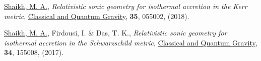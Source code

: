\begin{etaremune}
\item \underline{Shaikh, M. A.}, {\itshape Relativistic sonic geometry for isothermal accretion in the Kerr metric}, \href{https://doi.org/10.1088%2F1361-6382%2Faaa5cd}{{Classical and Quantum Gravity}}, {\bfseries 35}, 055002, (2018).
\item \underline{Shaikh, M. A.}, Firdousi, I. \& Das, T. K., {\itshape Relativistic sonic geometry for isothermal accretion in the Schwarzschild metric}, \href{https://doi.org/10.1088%2F1361-6382%2Faa7b19}{{Classical and Quantum Gravity}}, {\bfseries 34}, 155008, (2017).
\end{etaremune}